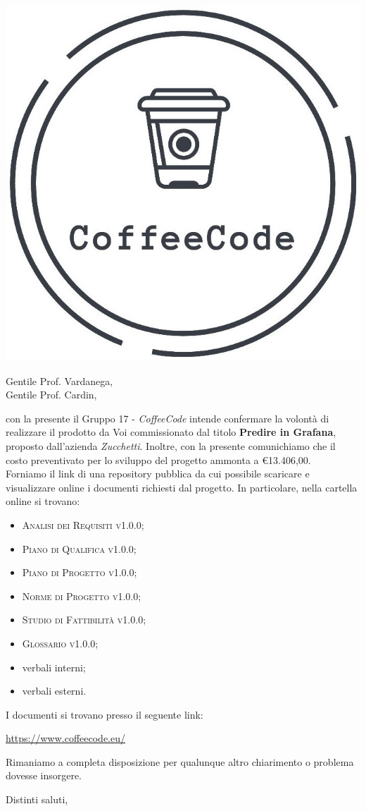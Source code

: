 \documentclass{letter}
\date{13 Aprile 2020}
\begin{document}
\begin{letter}{ }

\includegraphics[scale=0.17]{img/logo.jpg}

\opening{Gentile Prof. Vardanega, \\
Gentile Prof. Cardin,}

con la presente il Gruppo 17 - \textit{CoffeeCode} intende confermare la volontà di realizzare il prodotto da Voi commissionato dal titolo \textbf{Predire in Grafana}, proposto dall'azienda \textit{Zucchetti}.
Inoltre, con la presente comunichiamo che il costo preventivato per lo sviluppo del progetto ammonta a \euro 13.406,00. \\
Forniamo il link di una repository pubblica da cui possibile scaricare e visualizzare online i documenti richiesti dal progetto. In particolare, nella cartella online si trovano:
\begin{itemize}
  \item \textsc{Analisi dei Requisiti v1.0.0};
  \item \textsc{Piano di Qualifica v1.0.0};
  \item \textsc{Piano di Progetto v1.0.0};
  \item \textsc{Norme di Progetto v1.0.0};
  \item \textsc{Studio di Fattibilità v1.0.0};
  \item \textsc{Glossario v1.0.0};
  \item verbali interni;
  \item verbali esterni.
\end{itemize}

I documenti si trovano presso il seguente link:
\begin{center}
  \centering
  \href{https://www.coffeecode.eu/}{https://www.coffeecode.eu/}
\end{center}
\newpage
Rimaniamo a completa disposizione per qualunque altro chiarimento o problema dovesse insorgere.

\closing{Distinti saluti,}

\end{letter}
\end{document}

